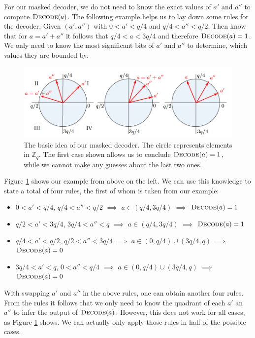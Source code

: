 For our masked decoder, we do not need to know the exact values of \(a'\) and \(a''\) to compute \(\textsc{Decode}(a)\). The following example helps us to lay down some rules for the decoder: Given \((a', a'')\) with \(0 < a' < q/4\) and \(q/4 < a'' < q/2\). Then know that for \(a=a'+a''\) it follows that \(q/4 < a < 3q/4\) and therefore \(\textsc{Decode}(a)=1\). We only need to know the most significant bits of \(a'\) and \(a''\) to determine, which values they are bounded by.
\begin{figure}[H]
	\centering
	\includegraphics[width=\textwidth]{maskedDecoder_1.png}
	\caption{The basic idea of our masked decoder. The circle represents elements in \(\mathbb{Z}_q\). The first case shown allows us to conclude \(\textsc{Decode}(a)=1\), while we cannot make any guesses about the last two ones. \cite{maskedRing}}
	\label{maskedDecoder_1}
\end{figure}
Figure \ref{maskedDecoder_1} shows our example from above on the left. We can use this knowledge to state a total of four rules, the first of whom is taken from our example:
\begin{itemize}
\item \(0 < a' < q/4\), \(q/4 < a'' < q/2\) \(\implies\) \(a \in (q/4,3q/4)\) \(\implies\) \(\textsc{Decode}(a)=1\)
\item \(q/2 < a' < 3q/4\), \(3q/4 < a'' < q\) \(\implies\) \(a \in (q/4,3q/4)\) \(\implies\) \(\textsc{Decode}(a)=1\)
\item \(q/4 < a' < q/2\), \(q/2 < a'' < 3q/4\) \(\implies\) \(a \in (0,q/4) \cup (3q/4,q)\) \(\implies\) \(\textsc{Decode}(a)=0\)
\item \(3q/4 < a' < q\), \(0 < a'' < q/4\) \(\implies\) \(a \in (0,q/4) \cup (3q/4,q)\) \(\implies\) \(\textsc{Decode}(a)=0\)
\end{itemize}
With swapping \(a'\) and \(a''\) in the above rules, one can obtain another four rules. From the rules it follows that we only need to know the quadrant of each \(a'\) an \(a''\) to infer the output of \(\textsc{Decode}(a)\). However, this does not work for all cases, as Figure \ref{maskedDecoder_1} shows. We can actually only apply those rules in half of the possible cases.

